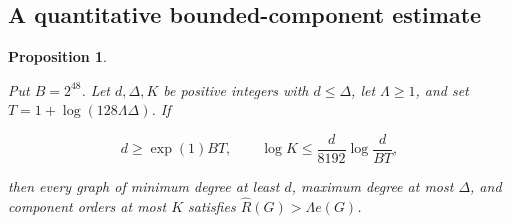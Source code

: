 \documentclass[11pt]{amsart}
\newtheorem{proposition}[theorem]{Proposition}
\theoremstyle{definition}
\theoremstyle{remark}
\numberwithin{equation}{section}
\begin{document}
\subsection{A quantitative bounded-component estimate}

\begin{proposition}\label{prop:bounded-components}

Put $B=2^{48}$. Let $ d,\Delta,K $ be positive integers with $ d\le\Delta $, let $\Lambda\ge1$, and set $ T=1+\log(128\Lambda\Delta)$. If

\begin{equation}
d\ge \exp(1)BT,\qquad \log K\le\frac{d}{8192}\log\frac{d}{BT},
\end{equation}

then every graph of minimum degree at least $d $, maximum degree at most $\Delta $, and component orders at most $ K $ satisfies $\widehat R(G)>\Lambda e(G)$.

\end{proposition}
\end{document}
